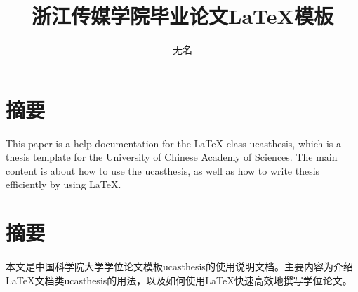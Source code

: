 \confidential{}%
\title{浙江传媒学院毕业论文\LaTeX{}模板}%
\author{无名}%
\maketitle%
\makedeclaration%
\nofootermatter
\chapter*{摘要}%

This paper is a help documentation for the \LaTeX{} class ucasthesis, which is  a thesis template for the University of Chinese Academy of Sciences. The main content is about how to use the ucasthesis, as well as how to write thesis efficiently by using \LaTeX{}.

\chapter*{摘要}%

本文是中国科学院大学学位论文模板ucasthesis的使用说明文档。主要内容为介绍\LaTeX{}文档类ucasthesis的用法，以及如何使用\LaTeX{}快速高效地撰写学位论文。


